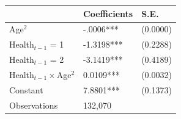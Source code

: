 
   
   \begin{tabular}{p{4.7cm}p{3.7cm}p{1.7cm}} %


\toprule
           \hline 
&  Coefficients & S.E.\\ [0.5ex] 
 \hline
 Age$^2$ &  -.0006***  & (0.0000)\\
 Health$_{t-1}$ = 1 &  -1.3198***  & (0.2288)\\
 Health$_{t-1}$ = 2 &  -3.1419***  & (0.4189)\\
 Health$_{t-1}\times$Age$^2$& 0.0109***   &(0.0032)\\
                     Constant&7.8801*** &  (0.1373)\\   [0.5ex] 
                     \hline  
                     Observations & 132,070\\[0.5ex] 
                    \hline
            \bottomrule
    \end{tabular}
